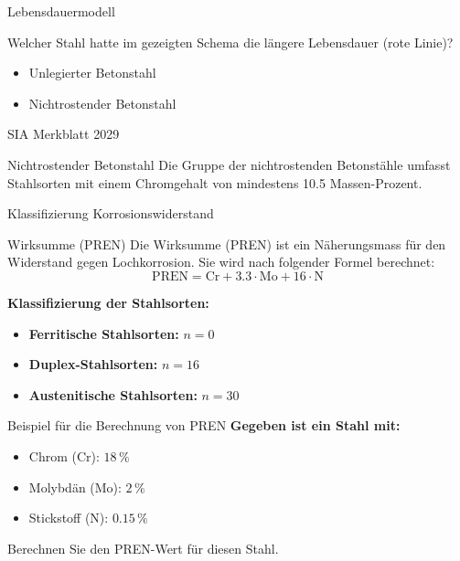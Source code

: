 \begin{frame}{Lebensdauermodell}
    \begin{Fragenblock}
        Welcher Stahl hatte im gezeigten Schema die längere Lebensdauer (rote Linie)?
        
        \begin{itemize}
            \item[\faSquare] Unlegierter Betonstahl
            \item[\textcolor{green!70!black}{\faCheckSquare}] Nichtrostender Betonstahl
        \end{itemize}
        
    \end{Fragenblock}
\end{frame}

\begin{frame}{SIA Merkblatt 2029}
    \begin{Definition_BS}{Nichtrostender Betonstahl}
        Die Gruppe der nichtrostenden Betonstähle umfasst Stahlsorten mit einem Chromgehalt von mindestens 10.5 Massen-Prozent.
    \end{Definition_BS}
\end{frame}

\begin{frame}{Klassifizierung Korrosionswiderstand}
    \begin{Definition_BS}{Wirksumme (PREN)}
        Die Wirksumme (PREN) ist ein Näherungsmass für den Widerstand gegen Lochkorrosion. Sie wird nach folgender Formel berechnet:
        \begin{equation*}
            \text{PREN} = \text{Cr} + 3.3 \cdot \text{Mo} + 16 \cdot \text{N}
        \end{equation*}
    \end{Definition_BS}
    

    \textbf{Klassifizierung der Stahlsorten:}
    \begin{itemize}
        \item [\textbullet] \textbf{Ferritische Stahlsorten:} \( n = 0 \)
        \item [\textbullet] \textbf{Duplex-Stahlsorten:} \( n = 16 \)
        \item [\textbullet] \textbf{Austenitische Stahlsorten:} \( n = 30 \)
    \end{itemize}
\end{frame}



\begin{frame}{Beispiel für die Berechnung von PREN}
    \textbf{Gegeben ist ein Stahl mit:}
    \begin{itemize}
        \item Chrom (Cr): \( 18\,\% \)
        \item Molybdän (Mo): \( 2\,\% \)
        \item Stickstoff (N): \( 0.15\,\% \)
    \end{itemize}
    \hspace{20pt}
    \begin{Fragenblock}
        Berechnen Sie den PREN-Wert für diesen Stahl.
    \end{Fragenblock}
\end{frame}
    
